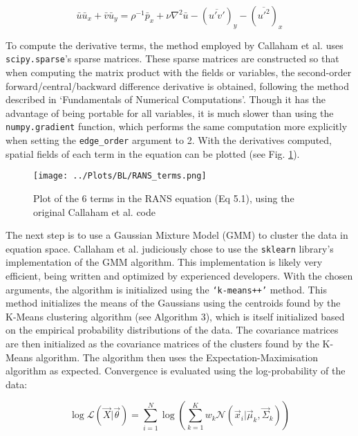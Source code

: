 \documentclass[12pt]{report} %
\begin{document}
\begin{equation}
  \bar{u} \bar{u}_x + \bar{v} \bar{u}_y = \rho^{-1} \bar{p}_x + \nu \nabla^2 \bar{u}  - (\overline{u' v'})_y - (\overline{u'^2})_x
\end{equation}

To compute the derivative terms, the method employed by Callaham et al. uses \texttt{scipy.sparse}’s sparse matrices. These sparse matrices are constructed so that when computing the matrix product with the fields or variables, the second-order forward/central/backward difference derivative is obtained, following the method described in ‘Fundamentals of Numerical Computations’\cite{finitediff}. Though it has the advantage of being portable for all variables, it is much slower than using the \texttt{numpy.gradient} function, which performs the same computation more explicitly when setting the \texttt{edge\_order} argument to 2. With the derivatives computed, spatial fields of each term in the equation can be plotted (see Fig. \ref{fig:RANS_terms}).

\begin{figure}
  \centering
  \texttt{[image: ../Plots/BL/RANS\_terms.png]}
  \caption{Plot of the 6 terms in the RANS equation (Eq 5.1), using the original Callaham et al. code}
  \label{fig:RANS_terms}
\end{figure}

The next step is to use a Gaussian Mixture Model (GMM) to cluster the data in equation space. Callaham et al. judiciously chose to use the \texttt{sklearn} library’s implementation of the GMM algorithm. This implementation is likely very efficient, being written and optimized by experienced developers. With the chosen arguments, the algorithm is initialized using the \texttt{‘k-means++’} method. This method initializes the means of the Gaussians using the centroids found by the K-Means clustering algorithm (see Algorithm 3), which is itself initialized based on the empirical probability distributions of the data\cite{arthur2007kmeans}. The covariance matrices are then initialized as the covariance matrices of the clusters found by the K-Means algorithm. The algorithm then uses the Expectation-Maximisation algorithm as expected. Convergence is evaluated using the log-probability of the data:

\begin{equation}
  \log \mathcal{L}(\vec{X} | \vec{\theta}) = \sum_{i=1}^{N} \log \left( \sum_{k=1}^{K} w_k \mathcal{N}(\vec{x}_i | \vec{\mu}_k, \vec{\Sigma}_k) \right)
\end{equation}
\end{document}

